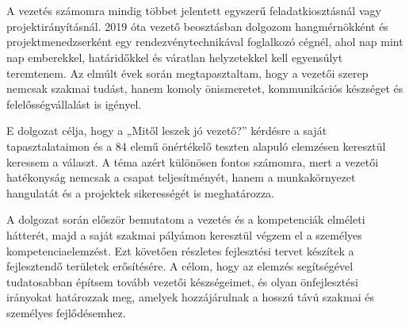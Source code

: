 \chapter{\bevezetes}
A vezetés számomra mindig többet jelentett egyszerű feladatkiosztásnál vagy projektirányításnál. 
2019 óta vezető beosztásban dolgozom hangmérnökként és projektmenedzserként egy rendezvénytechnikával foglalkozó cégnél, 
ahol nap mint nap emberekkel, határidőkkel és váratlan helyzetekkel kell egyensúlyt teremtenem. 
Az elmúlt évek során megtapasztaltam, hogy a vezetői szerep nemcsak szakmai tudást, hanem komoly önismeretet, 
kommunikációs készséget és felelősségvállalást is igényel. 

E dolgozat célja, hogy a „Mitől leszek jó vezető?” kérdésre a saját tapasztalataimon és a 84 elemű önértékelő 
teszten alapuló elemzésen keresztül keressem a választ. A téma azért különösen fontos számomra, mert a vezetői 
hatékonyság nemcsak a csapat teljesítményét, hanem a munkakörnyezet hangulatát és a projektek sikerességét is meghatározza.

A dolgozat során először bemutatom a vezetés és a kompetenciák elméleti hátterét, majd a saját szakmai pályámon 
keresztül végzem el a személyes kompetenciaelemzést. Ezt követően részletes fejlesztési tervet készítek a 
fejlesztendő területek erősítésére. A célom, hogy az elemzés segítségével tudatosabban építsem tovább vezetői 
készségeimet, és olyan önfejlesztési irányokat határozzak meg, 
amelyek hozzájárulnak a hosszú távú szakmai és személyes fejlődésemhez.